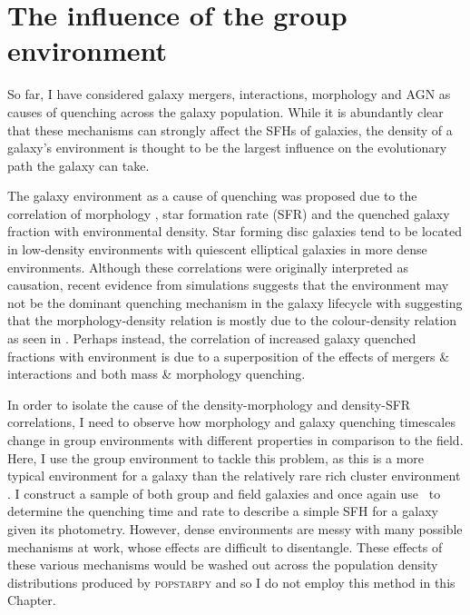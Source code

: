\chapter{The influence of the group environment}\label{chap:env}
 
So far, I have considered  galaxy mergers, interactions, morphology and AGN as causes of quenching across the galaxy population. While it is abundantly clear that these mechanisms can strongly affect the SFHs of galaxies, the density of a galaxy's environment is thought to be the largest influence on the evolutionary path the galaxy can take. 
 
 The galaxy environment as a cause of quenching was proposed due to the correlation of morphology \citep{dressler80, smail97, poggianti99, postman05, Bamford09}, star formation rate (SFR) and the quenched galaxy fraction \citep{kauffmann03, Baldry06, peng12, darvish16} with environmental density. Star forming disc galaxies tend to be located in low-density environments with quiescent elliptical galaxies in more dense environments. Although these correlations were originally interpreted as causation, recent evidence from simulations suggests that the environment may not be the dominant quenching mechanism in the galaxy lifecycle \citep{ref, ref} with \citet{Skibba09} suggesting that the morphology-density relation is mostly due to the colour-density relation as seen in \citet{pimbblet02}. Perhaps instead, the correlation of increased galaxy quenched fractions with environment is due to a superposition of the effects of mergers \& interactions and both mass \& morphology quenching. 
  
In order to isolate the cause of the density-morphology and density-SFR correlations, I need to observe how morphology and galaxy quenching timescales change in group environments with different properties in comparison to the field. Here, I use the group environment to tackle this problem, as this is a more typical environment for a galaxy than the relatively rare rich cluster environment \citep{carlberg04}. I construct a sample of both group and field galaxies and once again use \starpy\ to determine the quenching time and rate to describe a simple SFH for a galaxy given its photometry. However, dense environments are messy with many possible mechanisms at work, whose effects are difficult to disentangle. These effects of these various mechanisms would be washed out across the population density distributions produced by \textsc{popstarpy} and so I do not employ this method in this Chapter. 

